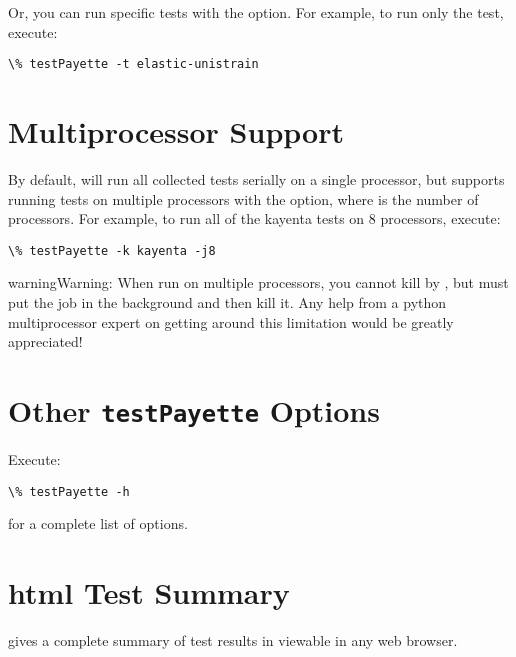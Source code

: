 \documentclass[letterpaper,10pt,english]{sphinxmanual}
\begin{document}
Or, you can run specific tests with the  option. For example, to run only
the  test, execute:

\begin{Verbatim}[commandchars=\\\{\}]
\% testPayette -t elastic-unistrain
\end{Verbatim}


\section{Multiprocessor Support}
\label{Files/test_payette:multiprocessor-support}
By default,  will run all collected tests serially on a single
processor, but supports running tests on multiple processors with the  option, where  is the number of processors. For example, to run
all of the kayenta tests on 8 processors, execute:

\begin{Verbatim}[commandchars=\\\{\}]
\% testPayette -k kayenta -j8
\end{Verbatim}

\begin{notice}{warning}{Warning:}
When run on multiple processors, you cannot kill  by
, but must put the job in the background and then kill it. Any help
from a python multiprocessor expert on getting around this limitation would be
greatly appreciated!
\end{notice}


\section{Other \texttt{testPayette} Options}
\label{Files/test_payette:other-testpayette-options}
Execute:

\begin{Verbatim}[commandchars=\\\{\}]
\% testPayette -h
\end{Verbatim}

for a complete list of options.


\section{html Test Summary}
\label{Files/test_payette:html-test-summary}
 gives a complete summary of test results in
 viewable in any web browser.
\end{document}
